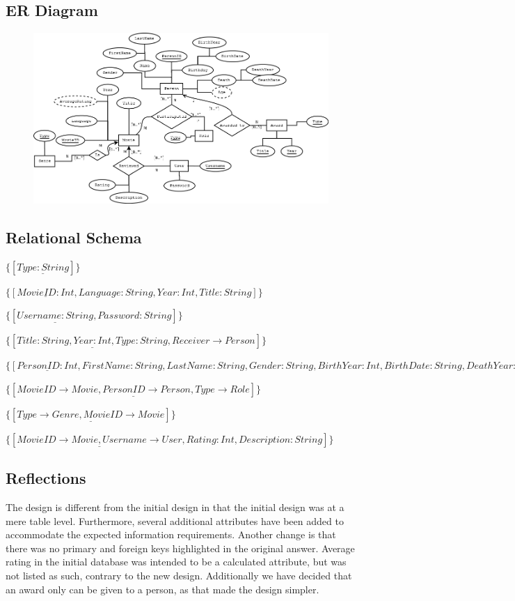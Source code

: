 \documentclass[10pt,a4paper,final]{report}
\begin{document}
\subsection*{ER Diagram}
\begin{figure}[h]
     \includegraphics[scale=0.4]{ERdiagram.png}
\end{figure}
\subsection*{Relational Schema}
\begin{description}[style=nextline]
     \item[Genre]
     $\{[\underline{Type:String}]\}$
     \item[Movie]
     $\{[\underline{MovieID:Int},Language:String,Year:Int,Title:String]\}$
     \item[User]
     $\{[\underline{Username:String},Password:String]\}$
     \item[Award]
     $\{[\underline{Title:String, Year:Int, Type:String}, Receiver \rightarrow Person]\}$
     \item[Person]
     $\{[\underline{PersonID:Int},FirstName:String, LastName:String, Gender:String, BirthYear:Int, BirthDate:String, DeathYear:Int, DeathDate:String]\}$
     \item[Participated]
     $\{[\underline{MovieID\rightarrow Movie, PersonID \rightarrow Person, Type \rightarrow Role}]\}$
     \item[Is]
     $\{[\underline{Type \rightarrow Genre, MovieID \rightarrow Movie}]\}$
     \item[Reviewed]
     $\{[\underline{MovieID \rightarrow Movie, Username \rightarrow User}, Rating:Int, Description:String]\}$
\end{description}

\subsection*{Reflections}
The design is different from the initial design in that the initial design was at a mere table level. Furthermore, several additional attributes have been added to accommodate the expected information requirements.
Another change is that there was no primary and foreign keys highlighted in the original answer.
Average rating in the initial database was intended to be a calculated attribute, but was not listed as such, contrary to the new design.
Additionally we have decided that an award only can be given to a person, as that made the design simpler.
\end{document}
